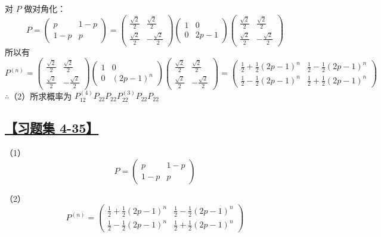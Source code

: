 对 $P$ 做对角化：
$$
P=\left(\begin{matrix}p & 1-p \\ 1-p & p\end{matrix}\right)
=\left(\begin{matrix}\frac{\sqrt{2}}{2} & \frac{\sqrt{2}}{2} \\ \frac{\sqrt{2}}{2} & -\frac{\sqrt{2}}{2}\end{matrix}\right)
\left(\begin{matrix}1 & 0 \\ 0 & 2p-1\end{matrix}\right)
\left(\begin{matrix}\frac{\sqrt{2}}{2} & \frac{\sqrt{2}}{2} \\ \frac{\sqrt{2}}{2} & -\frac{\sqrt{2}}{2}\end{matrix}\right)
$$
所以有
$$
P^{(n)}=\left(\begin{matrix}\frac{\sqrt{2}}{2} & \frac{\sqrt{2}}{2} \\ \frac{\sqrt{2}}{2} & -\frac{\sqrt{2}}{2}\end{matrix}\right)
\left(\begin{matrix}1 & 0 \\ 0 & (2p-1)^n\end{matrix}\right)
\left(\begin{matrix}\frac{\sqrt{2}}{2} & \frac{\sqrt{2}}{2} \\ \frac{\sqrt{2}}{2} & -\frac{\sqrt{2}}{2}\end{matrix}\right)
=\left(\begin{matrix}\frac{1}{2}+\frac{1}{2}(2p-1)^n & \frac{1}{2}-\frac{1}{2}(2p-1)^n \\ \frac{1}{2}-\frac{1}{2}(2p-1)^n & \frac{1}{2}+\frac{1}{2}(2p-1)^n\end{matrix}\right)
$$
$\therefore$（2）所求概率为 $P_{12}^{(4)}P_{22}P_{22}P_{22}^{(3)}P_{22}P_{22}$

\subsection{\hyperref[Q4-35]{【习题集 4-35】}}\label{A4-35}

（1）
$$
P=\left(\begin{matrix}p & 1-p \\ 1-p & p\end{matrix}\right)
$$

（2）
$$
P^{(n)}=\left(\begin{matrix}\frac{1}{2}+\frac{1}{2}(2p-1)^n & \frac{1}{2}-\frac{1}{2}(2p-1)^n \\ \frac{1}{2}-\frac{1}{2}(2p-1)^n & \frac{1}{2}+\frac{1}{2}(2p-1)^n\end{matrix}\right)
$$

